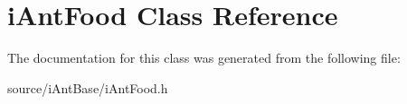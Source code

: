 \hypertarget{classi_ant_food}{}\section{i\+Ant\+Food Class Reference}
\label{classi_ant_food}


The documentation for this class was generated from the following file\+:\begin{DoxyCompactItemize}
\item 
source/i\+Ant\+Base/i\+Ant\+Food.\+h\end{DoxyCompactItemize}
